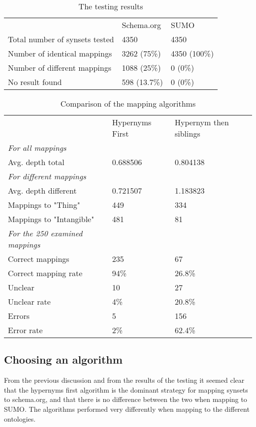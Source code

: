\begin{table}[h] %
	\centering
	\begin{tabular}{lll}
										& Schema.org	& SUMO			\\
		Total number of synsets tested 	& 4350			& 4350			\\
		Number of identical mappings 	& 3262 (75\%)	& 4350 (100\%)	\\
		Number  of different mappings	& 1088 (25\%)	& 0	(0\%)		\\
		No result found					& 598  (13.7\%)	& 0	(0\%)
	\end{tabular}
	\caption{The testing results}
	\label{table:AlgorithmResults}
\end{table}

\begin{table}[h]
	\centering
	\begin{tabular}{lll}
											& Hypernyms First 	& Hypernym then siblings	\\
		\emph{For all mappings}				&					&							\\
		Avg. depth total					& 0.688506 			& 0.804138					\\
		\emph{For different mappings}		&					&							\\
		Avg. depth different				& 0.721507			& 1.183823					\\
		Mappings to "Thing"					& 449				& 334						\\
		Mappings to "Intangible"			& 481				& 81						\\
		\emph{For the 250 examined mappings}&					&							\\
		Correct mappings					& 235				& 67						\\
		Correct mapping	rate				& 94\%				& 26.8\%					\\
		Unclear								& 10				& 27						\\
		Unclear	rate						& 4\%				& 20.8\%					\\
		Errors								& 5 				& 156 						\\
		Error rate							& 2\%				& 62.4\%					\\
	\end{tabular}
	\caption{Comparison of the mapping algorithms}
	\label{table:AlgorithmComparison}
\end{table}

\subsection{Choosing an algorithm}
From the previous discussion and from the results of the testing it seemed clear that the hypernyms first algorithm is
the dominant strategy for mapping synsets to schema.org, and that there is no difference between the two when mapping to SUMO.
The algorithms performed very differently when mapping to the different ontologies.


